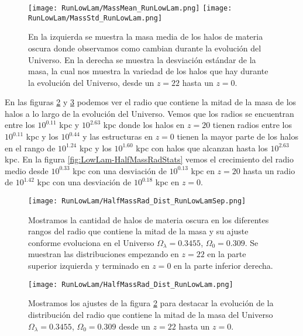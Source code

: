 \begin{figure}[H]
    \centering
    \texttt{[image: RunLowLam/MassMean\_RunLowLam.png]}
    \texttt{[image: RunLowLam/MassStd\_RunLowLam.png]}
    \caption[Media y desviación estándar de la distribución de masa]{\footnotesize En la izquierda se muestra la masa media de los halos de materia oscura donde observamos como cambian durante la evolución del Universo. En la derecha se muestra la desviación estándar de la masa, la cual nos muestra la variedad de los halos que hay durante la evolución del Universo, desde un $z=22$ hasta un $z=0$.}
    \label{fig:LowLam-MassStats}
\end{figure}

En las figuras \ref{fig:LowLam-HalfMassRadDistSep} y \ref{fig:LowLam-HalfMassRadDist} podemos ver el radio que contiene la mitad de la masa de los halos a lo largo de la evolución del Universo. Vemos que los radios se encuentran entre los $10^{0.11}$ kpc y $10^{2.63}$ kpc donde los halos en $z=20$ tienen radios entre los $10^{0.11}$ kpc y los $10^{0.44}$ y las estructuras en $z=0$ tienen la mayor parte de los halos en el rango de $10^{1.24}$ kpc y los $10^{1.60}$ kpc con halos que alcanzan hasta los $10^{2.63}$ kpc. En la figura \ref{fig:LowLam-HalfMassRadStats} vemos el crecimiento del radio medio desde $10^{0.33}$ kpc con una desviación de $10^{0.13}$ kpc en $z=20$ hasta un radio de $10^{1.42}$ kpc con una desviación de $10^{0.18}$ kpc en $z=0$.

\begin{figure}[H]
    \centering
    \texttt{[image: RunLowLam/HalfMassRad\_Dist\_RunLowLamSep.png]}
    \caption[Radio que contiene la mitad de la masa]{\footnotesize Mostramos la cantidad de halos de materia oscura en los diferentes rangos del radio que contiene la mitad de la masa y su ajuste conforme evoluciona en el Universo $\Omega_\lambda = 0.3455$, $\Omega_0 = 0.309$. Se muestran las distribuciones empezando en $z=22$ en la parte superior izquierda y terminado en $z=0$ en la parte inferior derecha.}
    \label{fig:LowLam-HalfMassRadDistSep}
\end{figure}

\begin{figure}[H]
    \centering
    \texttt{[image: RunLowLam/HalfMassRad\_Dist\_RunLowLam.png]}
    \caption[Distribución del radio que contiene la mitad de la masa]{\footnotesize Mostramos los ajustes de la figura \ref{fig:LowLam-HalfMassRadDistSep} para destacar la evolución de la distribución del radio que contiene la mitad de la masa del Universo $\Omega_\lambda = 0.3455$, $\Omega_0 = 0.309$ desde un $z=22$ hasta un $z=0$.}
    \label{fig:LowLam-HalfMassRadDist}
\end{figure}

